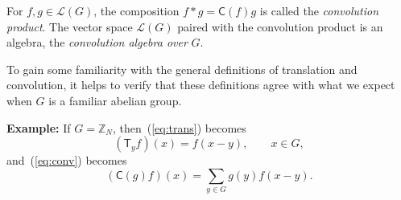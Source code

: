 \documentclass[reqno,onecolumn,oneside]{paper}
\newcommand{\<}{\ensuremath{\langle}}
\renewcommand{\>}{\ensuremath{\rangle}}
\newcommand{\field}[1]{\ensuremath{\mathbb{#1}}}
\newcommand{\Z}{\field{Z}}                   %
\newcommand{\vs}[1]{\ensuremath{\mathcal{#1}}}
\newcommand{\LG}{\vs{L}(G)}        %
\newcommand{\lt}[1]{\ensuremath{\mathsf{#1}}}
\begin{document}
For $f, g \in \LG$, the composition
$f * g  = \lt{C}(f)g$
is called the \emph{convolution product}.
The vector space $\LG$ paired with the convolution product
is an algebra, the \emph{convolution algebra over} $G$.

To gain some familiarity with the general 
definitions of translation %
and convolution, %
it helps to verify 
that these definitions agree with what we expect 
when $G$ is a familiar abelian group. 
\begin{example}
{\bf Example:}
If $G=\Z_N$, then~(\ref{eq:trans}) becomes
\begin{equation}
(\lt{T}_yf)(x) = f(x-y),  \qquad x \in G,
\end{equation}
and~(\ref{eq:conv}) becomes
\begin{equation}
(\lt{C}(g)f)(x) =\sum_{y \in G} g(y)f(x-y).
\end{equation}
\end{example}

% 

% 

%
%


%
%
%
%

%

%
\end{document}
